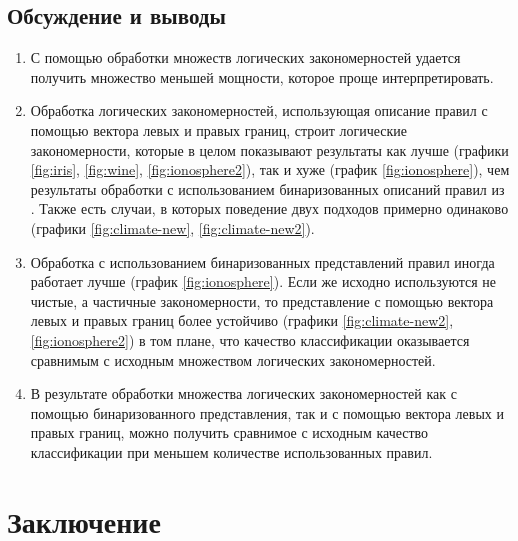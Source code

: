 \documentclass[12pt]{article}
\begin{document}
\subsection{Обсуждение и выводы}


\begin{enumerate}
  \item С помощью обработки множеств логических закономерностей
    удается получить множество меньшей мощности, которое проще
    интерпретировать.
  \item Обработка логических закономерностей, использующая описание
    правил с помощью вектора левых и правых границ, строит логические
    закономерности, которые в целом показывают результаты как лучше
    (графики \ref{fig:iris}, \ref{fig:wine}, \ref{fig:ionosphere2}), так и
    хуже (график \ref{fig:ionosphere}), чем результаты обработки с
    использованием бинаризованных описаний правил из
    \cite{novikov15}. Также есть случаи, в которых поведение двух
    подходов примерно одинаково (графики \ref{fig:climate-new},
    \ref{fig:climate-new2}).
  \item Обработка с использованием бинаризованных представлений правил
    иногда работает лучше (график \ref{fig:ionosphere}). Если же исходно
    используются не чистые, а частичные закономерности, то
    представление с помощью вектора левых и правых границ более
    устойчиво (графики \ref{fig:climate-new2}, \ref{fig:ionosphere2}) в том
    плане, что качество классификации оказывается сравнимым с исходным
    множеством логических закономерностей.
  \item В результате обработки множества логических закономерностей
    как с помощью бинаризованного представления, так и с помощью
    вектора левых и правых границ, можно получить сравнимое с исходным
    качество классификации при меньшем количестве использованных
    правил.
\end{enumerate}

\section{Заключение}
\end{document}
